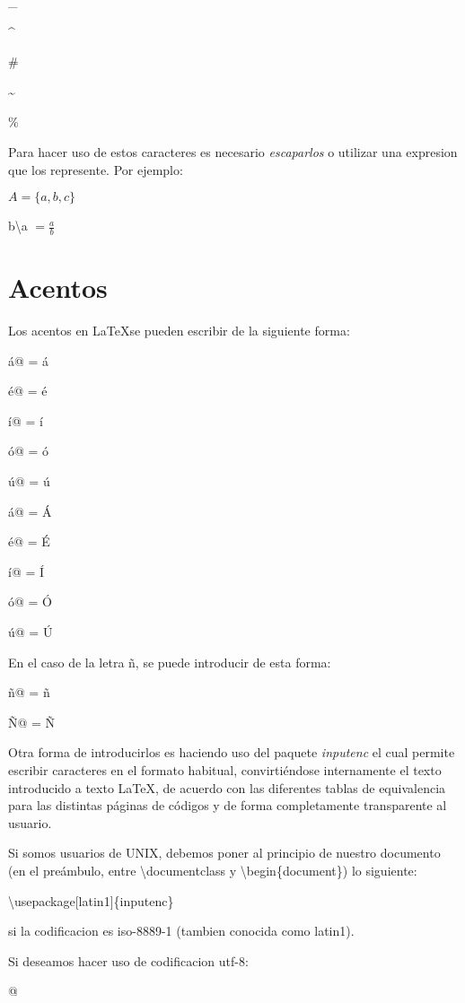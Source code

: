 \documentclass[letterpaper,11pt]{article}
\begin{document}
\_

\^{}

\#

\~{}

\%

Para hacer uso de estos caracteres es necesario \textit{escaparlos} o utilizar una expresion que los represente. Por ejemplo:

$A = \{a, b, c\}$

b\textbackslash a $= \frac{a}{b}$


\section{Acentos}

Los acentos en \LaTeX se pueden escribir de la siguiente forma:

\verb@\'a@ = \'a

\verb@\'e@ = \'e

\verb@\'i@ = \'i

\verb@\'o@ = \'o

\verb@\'u@ = \'u

\verb@\'a@ = \'A

\verb@\'e@ = \'E

\verb@\'i@ = \'I

\verb@\'o@ = \'O

\verb@\'u@ = \'U

En el caso de la letra \~n, se puede introducir de esta forma:

\verb@\~n@ = \~n

\verb@\~N@ = \~N

\noindent Otra forma de introducirlos es haciendo uso del paquete \textit{inputenc} el cual 
permite escribir caracteres en el formato habitual, convirtiéndose internamente el texto 
introducido a texto LaTeX, de acuerdo con las diferentes tablas de equivalencia para las 
distintas páginas de códigos y de forma completamente transparente al usuario.

\noindent Si somos usuarios de UNIX, debemos poner al principio de nuestro documento 
(en el preámbulo, entre \textbackslash documentclass y \textbackslash begin\{document\}) lo siguiente:


\textbackslash usepackage[latin1]\{inputenc\}


si la codificacion es iso-8889-1 (tambien conocida como latin1).


Si deseamos hacer uso de codificacion utf-8:

\verb@\usepackage[utf8]{inputenc}@
\end{document}
